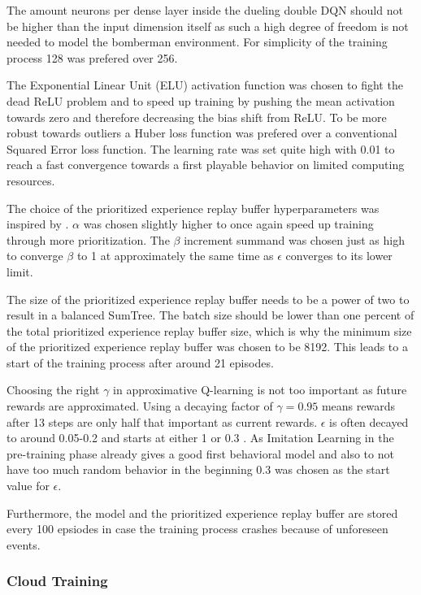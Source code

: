The amount neurons per dense layer inside the dueling double DQN should not be higher than the input dimension itself as such a high degree of freedom is not needed to model the bomberman environment. For simplicity of the training process 128 was prefered over 256. 

The Exponential Linear Unit (ELU) activation function was chosen to fight the dead ReLU problem and to speed up training by pushing the mean activation towards zero and therefore decreasing the bias shift from ReLU. To be more robust towards outliers a Huber loss function was prefered over a conventional Squared Error loss function. The learning rate was set quite high with 0.01 to reach a fast convergence towards a first playable behavior on limited computing resources. 

The choice of the prioritized experience replay buffer hyperparameters was inspired by \cite{Schaul2016}. $\alpha$ was chosen slightly higher to once again speed up training through more prioritization. The $\beta$ increment summand was chosen just as high to converge $\beta$ to 1 at approximately the same time as $\epsilon$ converges to its lower limit. 

The size of the prioritized experience replay buffer needs to be a power of two to result in a balanced SumTree. The batch size should be lower than one percent of the total prioritized experience replay buffer size, which is why the minimum size of the prioritized experience replay buffer was chosen to be 8192. This leads to a start of the training process after around 21 episodes. 

Choosing the right $\gamma$ in approximative Q-learning is not too important as future rewards are approximated. Using a decaying factor of $\gamma=0.95$ means rewards after 13 steps are only half that important as current rewards. $\epsilon$ is often decayed to around 0.05-0.2 and starts at either 1 or 0.3 \cite{Hessel2017, Kormelink2018, Franca2019}. As Imitation Learning in the pre-training phase already gives a good first behavioral model and also to not have too much random behavior in the beginning 0.3 was chosen as the start value for $\epsilon$. 

Furthermore, the model and the  prioritized experience replay buffer are stored every 100 epsiodes in case the training process crashes because of unforeseen events. 

\subsubsection{Cloud Training}
\label{ch:approachBf}

